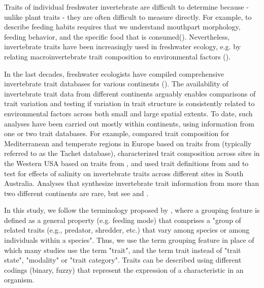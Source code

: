 \documentclass{article}
\begin{document}
Traits of individual freshwater invertebrate are difficult to determine because - unlike plant traits - they are often difficult to measure directly. For example, to describe feeding habits requires that we understand mouthpart morphology, feeding behavior, and the specific food that is consumed(\cite{moog_comprehensive_nodate}). Nevertheless, invertebrate traits have been increasingly used in freshwater ecology, e.g. by relating macroinvertebrate trait composition to environmental factors (\cite{bhowmik_large_2015, poff_developing_2010, szocs_effects_2014}).

In the last decades, freshwater ecologists have compiled comprehensive invertebrate trait databases for various continents (\cite{kefford_integrated_2020, Philips_and_Smith_NZ_DB_2018, schmidt-kloiber_www.freshwaterecology.info_2015, tomanova_trophic_2006, ussegliopolatera_biological_2000, vieira_database_nodate}). The availability of invertebrate trait data from different continents arguably enables comparisons of trait variation and testing if variation in trait structure is consistently related to environmental factors across both small and large spatial extents. To date, such analyses have been carried out mostly within continents, using information from one or two trait databases. For example, \citet{bonada_taxonomic_2007} compared trait composition for Mediterranean and temperate regions in Europe based on traits from \citet{ussegliopolatera_biological_2000} (typically referred to as the Tachet database), \citet{poff_developing_2010} characterized trait composition across sites in the Western USA based on traits from \citet{poff_functional_2006}, and \citet{botwe_effects_2018} used trait definitions from \citet{poff_functional_2006} and \citet{schafer_trait_2011} to test for effects of salinity on invertebrate traits across different sites in South Australia. Analyses that synthesize invertebrate trait information from more than two different continents are rare, but see \citet{brown_functional_2018} and \citet{statzner_reproductive_1997}. 


In this study, we follow the terminology proposed by \citet{schmera_proposed_2015}, where a grouping feature is defined as a general property (e.g. feeding mode) that comprises a "group of related traits (e.g., predator, shredder, etc.) that vary among species or among individuals within a species". Thus, we use the term grouping feature in place of which many studies use the term "trait", and the term trait instead of "trait state", "modality" or "trait category". 
Traits can be described using different codings (binary, fuzzy) that represent the expression of a characteristic in an organism.
\end{document}
